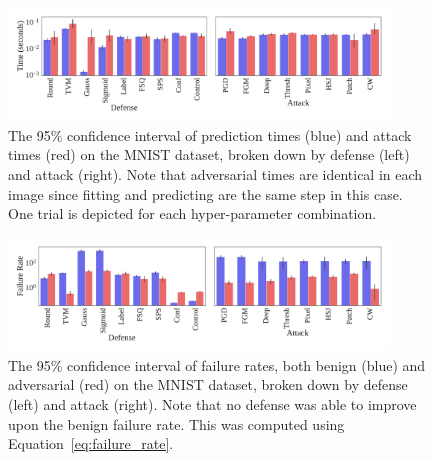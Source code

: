 \documentclass[journal]{IEEEtran}
\begin{document}
\begin{figure}[!hptb]
    {\centering
    \includegraphics[trim={0 0.85em 0 0.35em},clip,width=0.9\textwidth]{Fig19.pdf}
    \vspace{-1em}
    \caption{The 95\% confidence interval of prediction times (blue) and attack times (red) on the MNIST dataset, broken down by defense (left) and attack (right). Note that adversarial times are identical in each image since fitting and predicting are the same step in this case. One trial is depicted for each hyper-parameter combination.}
    \label{fig:mnist_time}
    } %
\end{figure}

\begin{figure}[!hptb]
    {\centering
    \includegraphics[trim={0 0.85em 0 0.35em},clip,width=0.9\textwidth]{Fig20.pdf}
    \vspace{-1em}
    \caption{The 95\% confidence interval of failure rates, both benign (blue) and adversarial (red) on the MNIST dataset, broken down by defense (left) and attack (right). Note that no defense was able to improve upon the benign failure rate. This was computed using Equation~\ref{eq:failure_rate}.}
    \label{fig:mnist_failure_rate}
    } %
\end{figure}
\end{document}
